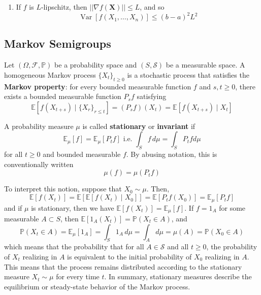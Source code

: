 \documentclass{article}
\DeclareMathOperator{\Var}{Var}
\begin{document}
\begin{solution}
\begin{enumerate}
    \item If $f$ is $L$-lipschitz, then $||\nabla f(\mathbf{X})|| \leq L$, and so  
    \[\Var[f(X_1, \ldots, X_n)] \leq (b - a)^2 L^2\]
\end{enumerate}
\end{solution}

\subsection{Markov Semigroups}

\begin{definition}
Let $(\Omega, \mathcal{F}, \mathbb{P})$ be a probability space and $(S, \mathcal{S})$ be a measurable space. A homogeneous Markov process $\{X_t\}_{t \geq 0}$ is a stochastic process that satisfies the \textbf{Markov property}: for every bounded measurable function $f$ and $s, t \geq 0$, there exists a bounded measurable function $P_s f$ satisfying 
\[\mathbb{E}[f (X_{t + s}) \mid \{X_r\}_{r \leq t}] = (P_s f) (X_t) = \mathbb{E}[ f(X_{t + s}) \mid X_t]\]
\end{definition}

\begin{definition}
A probability measure $\mu$ is called \textbf{stationary} or \textbf{invariant} if 
\[\mathbb{E}_\mu[f] = \mathbb{E}_\mu [P_t f] \text{ i.e. } \int_S f \,d \mu = \int_S P_t f d\mu\]
for all $t \geq 0$ and bounded measurable $f$. By abusing notation, this is conventionally written 
\[\mu(f) = \mu(P_t f)\]
\end{definition}

To interpret this notion, suppose that $X_0 \sim \mu$. Then, 
\[\mathbb{E}[f(X_t)] = \mathbb{E}[\mathbb{E}[f(X_t) \mid X_0]] = \mathbb{E}[P_t f (X_0)] = \mathbb{E}_\mu [P_t f]\]
and if $\mu$ is stationary, then we have $\mathbb{E}[f(X_t)] = \mathbb{E}_\mu [f]$. If $f = 1_A$ for some measurable $A \subset S$, then $\mathbb{E}[1_A (X_t)] = \mathbb{P}(X_t \in A)$, and 
\[\mathbb{P}(X_t \in A) = \mathbb{E}_\mu [1_A] = \int_S 1_A \,d\mu = \int_A d\mu = \mu(A) = \mathbb{P}(X_0 \in A)\]
which means that the probability that for all $A \in \mathcal{S}$ and all $t \geq 0$, the probability of $X_t$ realizing in $A$ is equivalent to the initial probability of $X_0$ realizing in $A$. This means that the process remains distributed according to the stationary measure $X_t \sim \mu$ for every time $t$. In summary, stationary measures describe the equilibrium or steady-state behavior of the Markov process.  
\end{document}
